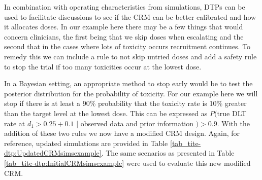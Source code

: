 In combination with operating characteristics from simulations, DTPs can be used to facilitate discussions to see if the CRM can be better calibrated and how it allocates doses. In our example here there may be a few things that would concern clinicians, the first being that we skip doses when escalating and the second that in the cases where lots of toxicity occurs recruitment continues. To remedy this we can include a rule to not skip untried doses and add a safety rule to stop the trial if too many toxicities occur at the lowest dose. 

In a Bayesian setting, an appropriate method to stop early would be to test the posterior distribution for the probability of toxicity. For our example here we will stop if there is at least a 90\% probability that the toxicity rate is 10\% greater than the target level at the lowest dose. This can be expressed as $P($true DLT rate at $d_1 > 0.25 + 0.1$ | observed data and prior information $) > 0.9$. With the addition of these two rules we now have a modified CRM design. Again, for reference, updated simulations are provided in Table \ref{tab_tite-dtp:UpdatedCRMsimsexample}. The same scenarios as presented in Table \ref{tab_tite-dtp:InitialCRMsimsexample} were used to evaluate this new modified CRM. 

